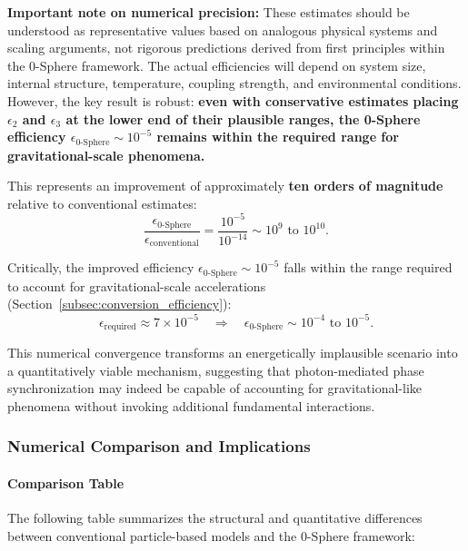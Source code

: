 \documentclass[12pt,letterpaper]{article}
\begin{document}
\textbf{Important note on numerical precision:} These estimates should be understood as representative values based on analogous physical systems and scaling arguments, not rigorous predictions derived from first principles within the 0-Sphere framework. The actual efficiencies will depend on system size, internal structure, temperature, coupling strength, and environmental conditions. However, the key result is robust: \textbf{even with conservative estimates placing $\epsilon_2$ and $\epsilon_3$ at the lower end of their plausible ranges, the 0-Sphere efficiency $\epsilon_{\text{0-Sphere}} \sim 10^{-5}$ remains within the required range for gravitational-scale phenomena.}

This represents an improvement of approximately \textbf{ten orders of magnitude} relative to conventional estimates:
\begin{equation}
\frac{\epsilon_{\text{0-Sphere}}}{\epsilon_{\text{conventional}}} = \frac{10^{-5}}{10^{-14}} \sim 10^{9} \text{ to } 10^{10}.
\end{equation}

Critically, the improved efficiency $\epsilon_{\text{0-Sphere}} \sim 10^{-5}$ falls within the range required to account for gravitational-scale accelerations (Section~\ref{subsec:conversion_efficiency}):
\begin{equation}
\epsilon_{\text{required}} \approx 7 \times 10^{-5} \quad \Rightarrow \quad \epsilon_{\text{0-Sphere}} \sim 10^{-4} \text{ to } 10^{-5}.
\end{equation}

This numerical convergence transforms an energetically implausible scenario into a quantitatively viable mechanism, suggesting that photon-mediated phase synchronization may indeed be capable of accounting for gravitational-like phenomena without invoking additional fundamental interactions.

\subsubsection{Numerical Comparison and Implications}
\label{subsubsec:numerical_comparison}

\paragraph{Comparison Table}

The following table summarizes the structural and quantitative differences between conventional particle-based models and the 0-Sphere framework:
\end{document}
